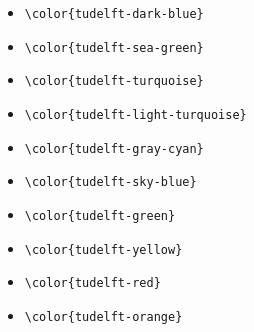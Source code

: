 \begin{itemize}
    \item {\color{tudelft-dark-blue}\verb|\color{tudelft-dark-blue}|}
    \item {\color{tudelft-sea-green}\verb|\color{tudelft-sea-green}|}
    \item {\color{tudelft-turquoise}\verb|\color{tudelft-turquoise}|}
    \item {\color{tudelft-light-turquoise}\verb|\color{tudelft-light-turquoise}|}
    \item {\color{tudelft-gray-cyan}\verb|\color{tudelft-gray-cyan}|}
    \item {\color{tudelft-sky-blue}\verb|\color{tudelft-sky-blue}|}
    \item {\color{tudelft-green}\verb|\color{tudelft-green}|}
    \item {\color{tudelft-yellow}\verb|\color{tudelft-yellow}|}
    \item {\color{tudelft-red}\verb|\color{tudelft-red}|}
    \item {\color{tudelft-orange}\verb|\color{tudelft-orange}|}
\end{itemize}